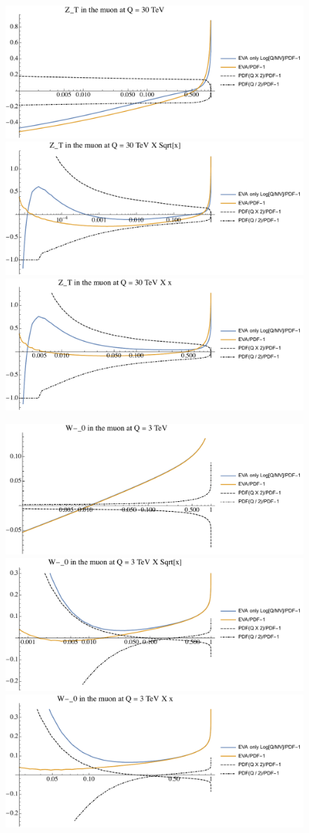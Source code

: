 \documentclass[a4paper,11pt]{article}
\begin{document}
\begin{figure}[ht]
\includegraphics[width=0.4\linewidth]{PlotPDFs/ratios/30TeV/Z_T_Q.pdf}
\includegraphics[width=0.4\linewidth]{PlotPDFs/ratios/30TeV/Z_T_Qsqrtx.pdf}
\includegraphics[width=0.4\linewidth]{PlotPDFs/ratios/30TeV/Z_T_Qx.pdf}
\end{figure}

\begin{figure}[ht]
\includegraphics[width=0.4\linewidth]{PlotPDFs/ratios/3TeV/W-_0_Q.pdf}
\includegraphics[width=0.4\linewidth]{PlotPDFs/ratios/3TeV/W-_0_Qsqrtx.pdf}
\includegraphics[width=0.4\linewidth]{PlotPDFs/ratios/3TeV/W-_0_Qx.pdf}
\end{figure}
\end{document}

